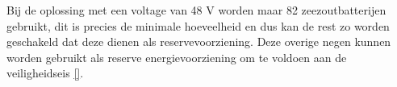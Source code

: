 Bij de oplossing met een voltage van 48 V worden maar 82 zeezoutbatterijen gebruikt, dit is precies de minimale hoeveelheid en dus kan de rest zo worden geschakeld dat deze dienen als reservevoorziening.
Deze overige negen kunnen worden gebruikt als reserve energievoorziening om te voldoen aan de veiligheidseis \ref{}. 







